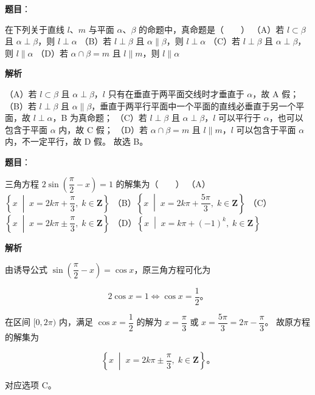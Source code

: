 \begin{answer}

\textbf{题目}：

在下列关于直线 $l$、$m$ 与平面 $\alpha$、$\beta$ 的命题中，真命题是\mbox{（　　）}
（A）若 $l \subset \beta$ 且 $\alpha \perp \beta$，则 $l \perp \alpha$
（B）若 $l \perp \beta$ 且 $\alpha \parallel \beta$，则 $l \perp \alpha$
（C）若 $l \perp \beta$ 且 $\alpha \perp \beta$，则 $l \parallel \alpha$
（D）若 $\alpha \cap \beta = m$ 且 $l \parallel m$，则 $l \parallel \alpha$

\textbf{解析}

（A）若 $l \subset \beta$ 且 $\alpha \perp \beta$，$l$ 只有在垂直于两平面交线时才垂直于 $\alpha$，故 A 假；
（B）若 $l \perp \beta$ 且 $\alpha \parallel \beta$，垂直于两平行平面中一个平面的直线必垂直于另一个平面，故 $l \perp \alpha$，B 为真命题；
（C）若 $l \perp \beta$ 且 $\alpha \perp \beta$，$l$ 可以平行于 $\alpha$，也可以包含于平面 $\alpha$ 内，故 C 假；
（D）若 $\alpha \cap \beta = m$ 且 $l \parallel m$，$l$ 可以包含于平面 $\alpha$ 内，不一定平行，故 D 假。
故选 B。


\end{answer}
\begin{answer}

\textbf{题目}：

三角方程 $2\sin\left(\dfrac{\pi}{2} - x\right) = 1$ 的解集为\mbox{（　　）}
（A）$\left\{x \;\middle|\; x = 2k\pi + \dfrac{\pi}{3},\; k \in \mathbf{Z}\right\}$
（B）$\left\{x \;\middle|\; x = 2k\pi + \dfrac{5\pi}{3},\; k \in \mathbf{Z}\right\}$
（C）$\left\{x \;\middle|\; x = 2k\pi \pm \dfrac{\pi}{3},\; k \in \mathbf{Z}\right\}$
（D）$\left\{x \;\middle|\; x = k\pi + (-1)^k,\; k \in \mathbf{Z}\right\}$

\textbf{解析}

由诱导公式 $\sin\left(\dfrac{\pi}{2} - x\right) = \cos x$，原三角方程可化为

\nopagebreak[4]
\[
2\cos x = 1 \iff \cos x = \dfrac{1}{2}\mbox{。}
\]

在区间 $[0, 2\pi)$ 内，满足 $\cos x = \dfrac{1}{2}$ 的解为 $x = \dfrac{\pi}{3}$ 或 $x = \dfrac{5\pi}{3} = 2\pi - \dfrac{\pi}{3}$。
故原方程的解集为

\nopagebreak[4]
\[
\left\{x \;\middle|\; x = 2k\pi \pm \dfrac{\pi}{3},\; k \in \mathbf{Z}\right\}\mbox{。}
\]

对应选项 C。


\end{answer}
